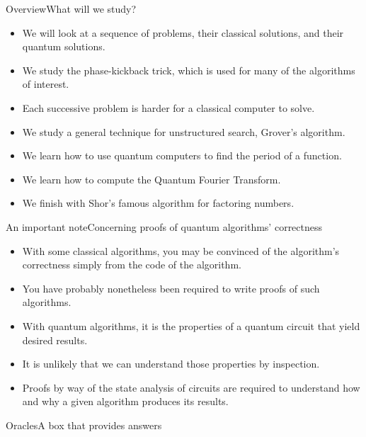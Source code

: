 
\begin{frame}{Overview}{What will we study?}

\begin{itemize}[<+->]
    \item We will look at a sequence of problems, their classical solutions, and their quantum solutions.
    \item We study the phase-kickback trick, which is used for many of the algorithms of interest.
    \item Each successive problem is harder for a classical computer to solve.
    \item We study a general technique for unstructured search, Grover's algorithm.
    \item We learn how to use quantum computers to find the period of a function.
    \item We learn how to compute the Quantum Fourier Transform.
    \item We finish with Shor's famous algorithm for factoring numbers.
\end{itemize}
    
\end{frame}

\begin{frame}{An important note}{Concerning proofs of quantum algorithms' correctness}

\begin{itemize}
    \item With some classical algorithms, you may be convinced of the algorithm's correctness simply from the code of the algorithm.
    \item You have probably nonetheless been required to write proofs of such algorithms.
    \item With quantum algorithms, it is the properties of a quantum circuit that yield desired results.
    \item It is unlikely that we can understand those properties by inspection.
    \item Proofs by way of the state analysis of circuits are required to understand how and why a given algorithm produces its results.
\end{itemize}
    
\end{frame}

\begin{frame}{Oracles}{A box that provides answers}
\end{frame}